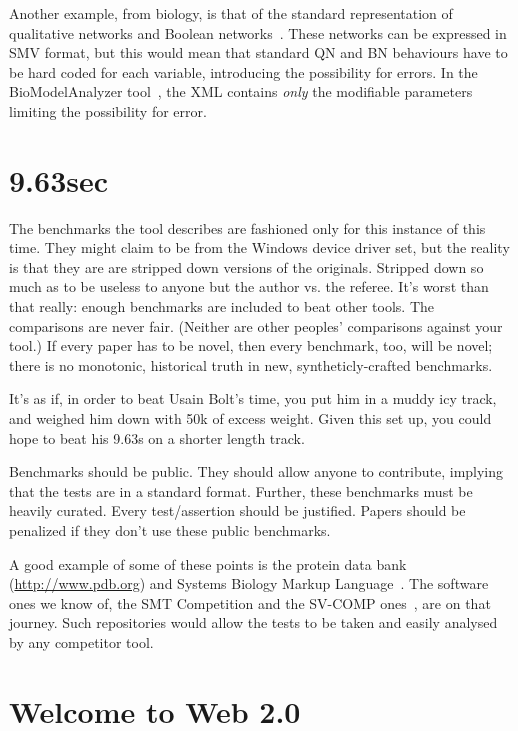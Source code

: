 \documentclass[conference]{IEEEtran}
\begin{document}
Another example, from biology, is that of the standard representation
of qualitative networks and Boolean
networks~\cite{Kauffman1969,Schaub2007}.  These networks can be
expressed in SMV format, but this would mean that standard QN and BN
behaviours have to be hard coded for each variable, introducing the
possibility for errors. In the BioModelAnalyzer
tool~\cite{Benque2012}, the XML contains \emph{only} the modifiable
parameters limiting the possibility for error.


\section{9.63sec} 

The benchmarks the tool describes are fashioned only for this instance
of this time. They might claim to be from the Windows device driver
set, but the reality is that they are are stripped down versions of
the originals. Stripped down so much as to be useless to anyone but
the author vs. the referee. It's worst than that really: enough
benchmarks are included to beat other tools. The comparisons are never
fair. (Neither are other peoples' comparisons against your tool.) If
every paper has to be novel, then every benchmark, too, will be novel;
there is no monotonic, historical truth in new, syntheticly-crafted
benchmarks.

It's as if, in order to beat Usain Bolt's time, you put him in a muddy
icy track, and weighed him down with 50k of excess weight. Given this
set up, you could hope to beat his 9.63s on a shorter length track.

Benchmarks should be public. They should allow anyone to contribute,
implying that the tests are in a standard format. Further, these
benchmarks must be heavily curated. Every test/assertion should be
justified. Papers should be penalized if they don't use these public
benchmarks.

A good example of some of these points is the protein data bank
(\url{http://www.pdb.org}) and Systems Biology Markup
Language~\cite{Hucka2003,Chaouiya2013}. The software ones we know of,
the SMT Competition and the SV-COMP ones~\cite{SMTComp2014,
  SVCOMP2015}, are on that journey. Such repositories would
allow the tests to be taken and easily analysed by any competitor
tool.

\section{Welcome to Web 2.0} 
\end{document}
